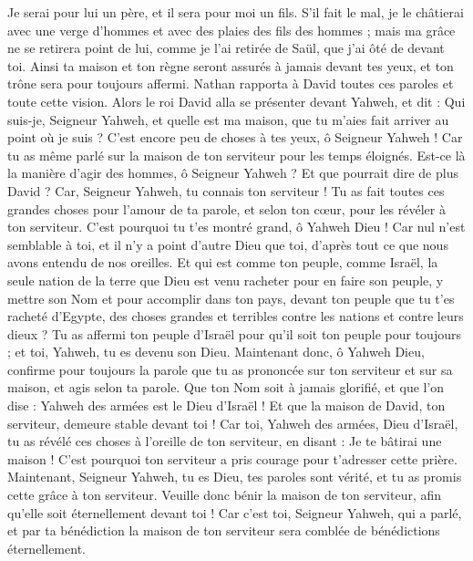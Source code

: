 \begin{multicols}{2}
Je serai pour lui un père, et il sera pour moi un fils. S'il fait le mal, je le châtierai avec une verge d'hommes et avec des plaies des fils des hommes ;
mais ma grâce ne se retirera point de lui, comme je l'ai retirée de Saül, que j'ai ôté de devant toi.
Ainsi ta maison et ton règne seront assurés à jamais devant tes yeux, et ton trône sera pour toujours affermi.
Nathan rapporta à David toutes ces paroles et toute cette vision.
Alors le roi David alla se présenter devant Yahweh, et dit : Qui suis-je, Seigneur Yahweh, et quelle est ma maison, que tu m'aies fait arriver au point où je suis ?
C'est encore peu de choses à tes yeux, ô Seigneur Yahweh ! Car tu as même parlé sur la maison de ton serviteur pour les temps éloignés. Est-ce là la manière d'agir des hommes, ô Seigneur Yahweh ?
Et que pourrait dire de plus David ? Car, Seigneur Yahweh, tu connais ton serviteur !
Tu as fait toutes ces grandes choses pour l'amour de ta parole, et selon ton cœur, pour les révéler à ton serviteur.
C'est pourquoi tu t'es montré grand, ô Yahweh Dieu ! Car nul n'est semblable à toi, et il n'y a point d'autre Dieu que toi, d'après tout ce que nous avons entendu de nos oreilles.
Et qui est comme ton peuple, comme Israël, la seule nation de la terre que Dieu est venu racheter pour en faire son peuple, y mettre son Nom et pour accomplir dans ton pays, devant ton peuple que tu t'es racheté d'Egypte, des choses grandes et terribles contre les nations et contre leurs dieux ?
Tu as affermi ton peuple d'Israël pour qu'il soit ton peuple pour toujours ; et toi, Yahweh, tu es devenu son Dieu.
Maintenant donc, ô Yahweh Dieu, confirme pour toujours la parole que tu as prononcée sur ton serviteur et sur sa maison, et agis selon ta parole.
Que ton Nom soit à jamais glorifié, et que l'on dise : Yahweh des armées est le Dieu d'Israël ! Et que la maison de David, ton serviteur, demeure stable devant toi !
Car toi, Yahweh des armées, Dieu d'Israël, tu as révélé ces choses à l'oreille de ton serviteur, en disant : Je te bâtirai une maison ! C'est pourquoi ton serviteur a pris courage pour t'adresser cette prière.
Maintenant, Seigneur Yahweh, tu es Dieu, tes paroles sont vérité, et tu as promis cette grâce à ton serviteur.
Veuille donc bénir la maison de ton serviteur, afin qu'elle soit éternellement devant toi ! Car c'est toi, Seigneur Yahweh, qui a parlé, et par ta bénédiction la maison de ton serviteur sera comblée de bénédictions éternellement.

\end{multicols}
